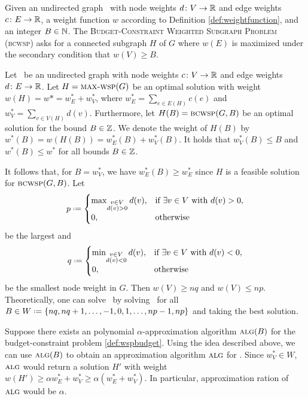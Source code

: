 \begin{definition}
	\label{def:wspbudget}
	Given an undirected graph \ugraph\ with node weights $d \colon V \to \mathbb{R}$ and edge weights $c \colon E \to \mathbb{R}$, a weight function $w$ according to Definition \ref{def:weightfunction}, and an integer $B \in \mathbb{N}$. The \textsc{Budget-Constraint Weighted Subgraph Problem} (\textsc{bcwsp}) asks for a connected subgraph $H$ of $G$ where $w(E)$ is maximized under the secondary condition that $w(V) \geq B$.
\end{definition}

Let \ugraph\ be an undirected graph with node weights $c\colon V \to \mathbb{R}$ and edge weights $d\colon E \to \mathbb{R}$. Let $H = \text{\textsc{max-wsp}}(G)$ be an optimal solution with weight $w(H) = w* = w_E^* + w_V^*$, where $w_E^* = \sum_{e \in E(H)} c(e)$ and $w_V^* = \sum_{v \in V(H)} d(v)$. Furthermore, let $H(B) = \text{\textsc{bcwsp}}(G, B)$ be an optimal solution for the bound $B \in \mathbb{Z}$. We denote the weight of $H(B)$ by $w^*(B) = w(H(B)) = w_E^*(B) + w_V^*(B)$. It holds that $w_V^*(B) \leq B$ and $w^*(B) \leq w^*$ for all bounds $B \in \mathbb{Z}$.\medskip

It follows that, for $B = w_V^*$, we have $w_E^*(B) \geq w_E^*$ since $H$ is a feasible solution for $\text{\textsc{bcwsp}}(G, B)$. Let
$$p \defeq 
\begin{cases}
\max_{\substack{v \in V\\ d(v) > 0}} d(v), & \text{if } \exists v \in V \text{ with } d(v) > 0,\\
0, & \text{otherwise}
\end{cases}
$$
be the largest and
$$q \defeq
\begin{cases}
\min_{\substack{v \in V\\ d(v) < 0}} d(v), & \text{if } \exists v \in V \text{ with } d(v) < 0,\\
0, & \text{otherwise}
\end{cases}
$$
be the smallest node weight in $G$. Then $w(V) \geq nq$ and $w(V) \leq np$. Theoretically, one can solve \maxWSP\ by solving \maxBCWSP\ for all $B \in W \defeq \{ nq, nq + 1, \ldots, -1, 0, 1, \ldots, np - 1, np\}$ and taking the best solution.\medskip

Suppose there exists an polynomial $\alpha$-approximation algorithm $\textsc{alg}(B)$ for the budget-constraint problem \eqref{def:wspbudget}. Using the idea described above, we can use $\textsc{alg}(B)$ to obtain an approximation algorithm $\textsc{alg}$ for \maxWSP. Since $w_V^* \in W$, $\textsc{alg}$ would return a solution $H'$ with weight $w(H') \geq \alpha w_E^* + w_V^* \geq \alpha (w_E^* + w_V^*)$. In particular, approximation ration of $\textsc{alg}$ would be $\alpha$.\medskip

